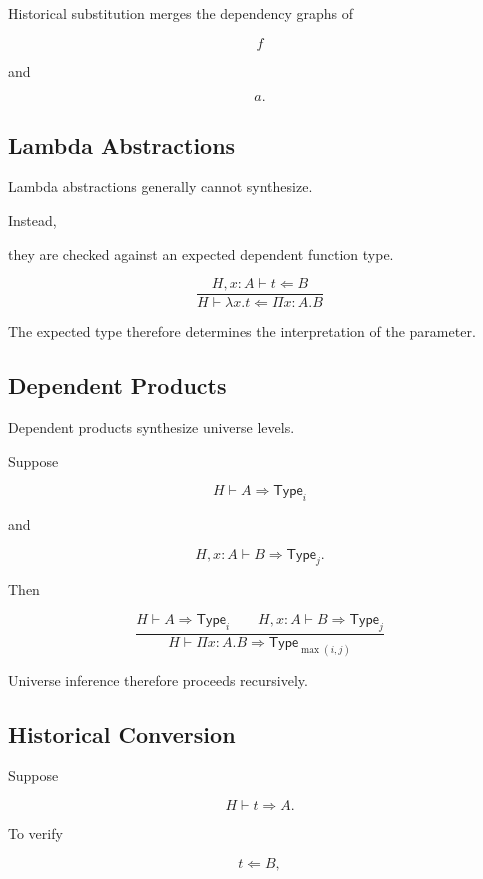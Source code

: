 \documentclass[12pt,oneside]{article}
\theoremstyle{definition}
\theoremstyle{remark}
\newcommand{\Type}{\mathsf{Type}}
\begin{document}
Historical substitution merges the dependency graphs of

\[
f
\]

and

\[
a.
\]


\subsection{Lambda Abstractions}

Lambda abstractions generally cannot synthesize.

Instead,

they are checked against an expected dependent function type.

\[
\frac{
H,
x:A
\vdash
t
\Leftarrow
B
}{
H
\vdash
\lambda x.t
\Leftarrow
\Pi x:A.B
}
\]

The expected type therefore determines the interpretation of the parameter.


\subsection{Dependent Products}

Dependent products synthesize universe levels.

Suppose

\[
H
\vdash
A
\Rightarrow
\Type_i
\]

and

\[
H,
x:A
\vdash
B
\Rightarrow
\Type_j.
\]

Then

\[
\frac{
H
\vdash
A
\Rightarrow
\Type_i
\qquad
H,x:A
\vdash
B
\Rightarrow
\Type_j
}{
H
\vdash
\Pi x:A.B
\Rightarrow
\Type_{\max(i,j)}
}
\]

Universe inference therefore proceeds recursively.


\subsection{Historical Conversion}

Suppose

\[
H
\vdash
t
\Rightarrow
A.
\]

To verify

\[
t
\Leftarrow
B,
\]
\end{document}
